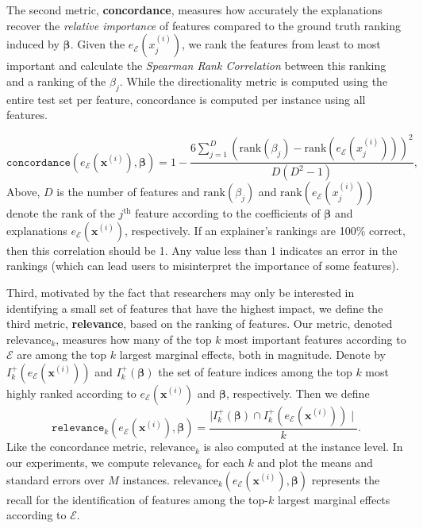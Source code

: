\documentclass[mnsc,blindrev]{informs3}
\newcommand{\mE}{\mathcal{E}}
\begin{document}
      The second metric, \textbf{concordance}, measures how accurately the explanations recover the \textit{relative importance} of features compared to the ground truth ranking induced by $\boldsymbol{\beta}$. Given the $e_\mathcal{E}(x^{(i)}_j)$, we rank the features from least to most important and calculate the \emph{Spearman Rank Correlation} \citep{spearman1904proof} between this ranking and a ranking of the $\beta_j$. While the directionality metric is computed using the entire test set per feature, concordance is computed per instance using all features.

    \begin{equation}
       \texttt{concordance}(e_\mE(\mathbf{x}^{(i)}),\boldsymbol{\beta}) = 1 - \frac{6\sum_{j=1}^D (\text{rank}(\beta_j) - \text{rank}(e_\mE(x^{(i)}_j)))^2}{D(D^2-1)},
    \end{equation}
    Above, $D$ is the number of features and $\text{rank}(\beta_j)$ and $\text{rank}(e_\mE(x^{(i)}_j))$ denote the rank of the $j^{\text{th}}$ feature according to the coefficients of $\boldsymbol{\beta}$ and explanations $e_\mE(\mathbf{x}^{(i)})$, respectively. If an explainer's rankings are 100\% correct, then this correlation should be 1. Any value less than 1 indicates an error in the rankings (which can lead users to misinterpret the importance of some features).
    
Third, motivated by the fact that researchers may only be interested in identifying a small set of features that have the highest impact, we define the third metric, \textbf{relevance}, based on the ranking of features. Our metric, denoted $\text{relevance}_k$, measures how many of the top $k$ most important features according to $\mathcal{E}$  are among the top $k$ largest  marginal effects, both in magnitude. Denote by $I_k^+(e_\mE(\mathbf{x}^{(i)}))$ and $I_k^+(\boldsymbol{\beta})$  the set of feature indices among the top $k$ most highly ranked according to $e_\mE(\mathbf{x}^{(i)})$ and $\boldsymbol{\beta}$, respectively. Then we define 
    \begin{equation}
        \texttt{relevance}_k(e_\mE(\mathbf{x}^{(i)}), \boldsymbol{\beta}) = \frac{\mid I_k^+(\boldsymbol{\beta}) \cap I_k^+(e_\mE(\mathbf{x}^{(i)}))\mid}{k}.
    \end{equation}
     Like the concordance metric, $\text{relevance}_k$ is also computed at the instance level. 
    In our experiments, we compute $\text{relevance}_k$ for each $k$ and plot the means and standard errors over $M$ instances. $\text{relevance}_k(e_\mE(\mathbf{x}^{(i)}), \boldsymbol{\beta})$ represents the recall for the identification of features among the top-$k$ largest marginal effects according to $\mathcal{E}$.       
    
\end{document}
